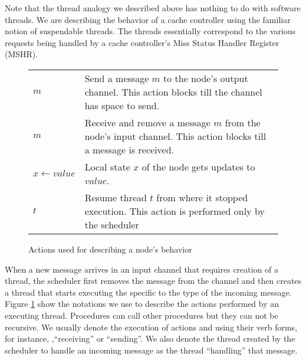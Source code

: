 Note that the thread analogy we described above has nothing to do with software
threads. We are describing the behavior of a cache controller using the familiar
notion of suspendable threads. The threads essentially correspond to the various
requests being handled by a cache controller's Miss Status Handler Register
(MSHR).

\begin{figure}
\begin{tabularx}{\linewidth}{|l|X|}
\hline
\send{} $m$ & Send a message $m$ to the node's output channel. This action
blocks till the channel has space to send.\\
\receive{} $m$ & Receive and remove a message $m$ from the node's input channel.
This action blocks till a message is received.\\
$x \gets value$ & Local state $x$ of the node gets updates to $value$.\\
\resume{} $t$ & Resume thread $t$ from where it stopped execution. This action
is performed only by the scheduler\\
\hline
\end{tabularx}
\caption{Actions used for describing a node's behavior}
\label{actions}
\end{figure}

When a new message arrives in an input channel that requires creation of a
thread, the scheduler first removes the message from the channel and then
creates a thread that starts executing the \procedure{} specific to the type of
the incoming message. Figure \ref{actions} show the notations we use to
describe the actions performed by an executing thread. Procedures can call
other procedures but they can not be recursive. We usually denote the execution
of actions \receive{} and \send{} using their verb forms, for instance,
,``receiving'' or ``sending''. We also denote the thread created by the
scheduler to handle an incoming message as the thread ``handling'' that
message.
